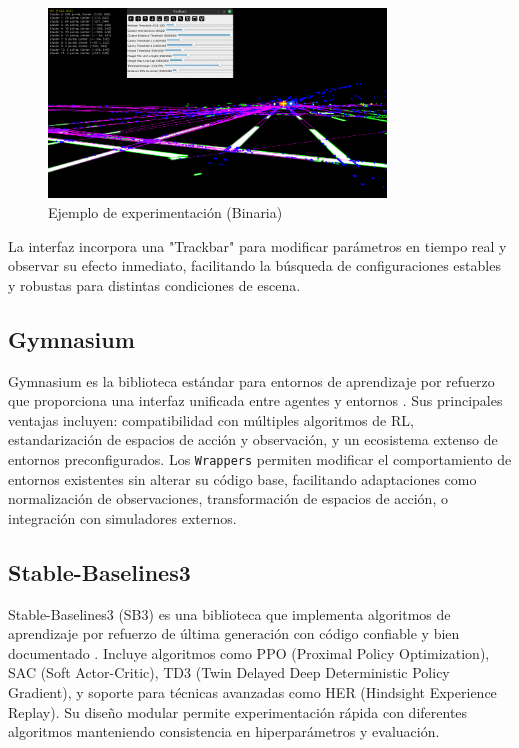 \begin{figure}[!ht]
	
		\includegraphics[width=0.8\textwidth]{img/reticule/experimentationBinary}
		\caption{Ejemplo de experimentación (Binaria)}
		\label{fig:experimentationBinary-teo}
	
\end{figure}


La interfaz incorpora una "Trackbar" para modificar parámetros en tiempo real y observar su efecto inmediato,
facilitando la búsqueda de configuraciones estables y robustas para distintas condiciones de escena.

\subsection{Gymnasium}\label{sec:gymnasium}

Gymnasium es la biblioteca estándar para entornos de aprendizaje por refuerzo que proporciona una interfaz
unificada entre agentes y entornos \cite{towers2024gymnasium}. Sus principales ventajas incluyen:
compatibilidad con múltiples algoritmos de RL, estandarización de espacios de acción y observación,
y un ecosistema extenso de entornos preconfigurados. Los \texttt{Wrappers} permiten modificar el comportamiento
de entornos existentes sin alterar su código base, facilitando adaptaciones como normalización de observaciones,
transformación de espacios de acción, o integración con simuladores externos.

\subsection{Stable-Baselines3}\label{sec:stable-baselines3}

Stable-Baselines3 (SB3) es una biblioteca que implementa algoritmos de aprendizaje por refuerzo de última
generación con código confiable y bien documentado \cite{raffin2021stable}. Incluye algoritmos como
PPO (Proximal Policy Optimization), SAC (Soft Actor-Critic), TD3 (Twin Delayed Deep Deterministic Policy Gradient),
y soporte para técnicas avanzadas como HER (Hindsight Experience Replay). Su diseño modular permite
experimentación rápida con diferentes algoritmos manteniendo consistencia en hiperparámetros y evaluación.
